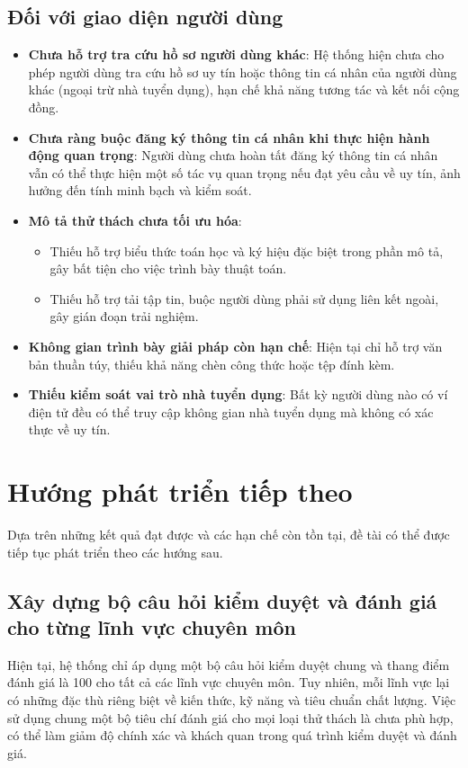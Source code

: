 \subsection{Đối với giao diện người dùng}
\begin{itemize}
  \item \textbf{Chưa hỗ trợ tra cứu hồ sơ người dùng khác}: Hệ thống hiện chưa cho phép người dùng tra cứu hồ sơ uy tín hoặc thông tin cá nhân của người dùng khác (ngoại trừ nhà tuyển dụng), hạn chế khả năng tương tác và kết nối cộng đồng.
  \item \textbf{Chưa ràng buộc đăng ký thông tin cá nhân khi thực hiện hành động quan trọng}: Người dùng chưa hoàn tất đăng ký thông tin cá nhân vẫn có thể thực hiện một số tác vụ quan trọng nếu đạt yêu cầu về uy tín, ảnh hưởng đến tính minh bạch và kiểm soát.
  \item \textbf{Mô tả thử thách chưa tối ưu hóa}:
        \begin{itemize}
          \item Thiếu hỗ trợ biểu thức toán học và ký hiệu đặc biệt trong phần mô tả, gây bất tiện cho việc trình bày thuật toán.
          \item Thiếu hỗ trợ tải tập tin, buộc người dùng phải sử dụng liên kết ngoài, gây gián đoạn trải nghiệm.
        \end{itemize}
  \item \textbf{Không gian trình bày giải pháp còn hạn chế}: Hiện tại chỉ hỗ trợ văn bản thuần túy, thiếu khả năng chèn công thức hoặc tệp đính kèm.
  \item \textbf{Thiếu kiểm soát vai trò nhà tuyển dụng}: Bất kỳ người dùng nào có ví điện tử đều có thể truy cập không gian nhà tuyển dụng mà không có xác thực về uy tín.
\end{itemize}

\section{Hướng phát triển tiếp theo}

Dựa trên những kết quả đạt được và các hạn chế còn tồn tại, đề tài có thể được tiếp tục phát triển theo các hướng sau.

\subsection{Xây dựng bộ câu hỏi kiểm duyệt và đánh giá cho từng lĩnh vực chuyên môn}

Hiện tại, hệ thống chỉ áp dụng một bộ câu hỏi kiểm duyệt chung và thang điểm đánh giá là 100 cho tất cả các lĩnh vực chuyên môn. Tuy nhiên, mỗi lĩnh vực lại có những đặc thù riêng biệt về kiến thức, kỹ năng và tiêu chuẩn chất lượng.
Việc sử dụng chung một bộ tiêu chí đánh giá cho mọi loại thử thách là chưa phù hợp, có thể làm giảm độ chính xác và khách quan trong quá trình kiểm duyệt và đánh giá.

